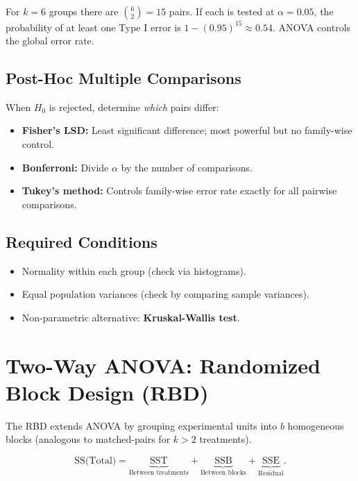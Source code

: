 \documentclass[12pt, a4paper]{article}
\begin{document}
For $k = 6$ groups there are $\binom{6}{2} = 15$ pairs. If each is tested at $\alpha = 0.05$, the probability of at least one Type I error is $1 - (0.95)^{15} \approx 0.54$. ANOVA controls the global error rate.

\subsection{Post-Hoc Multiple Comparisons}

When $H_0$ is rejected, determine \emph{which} pairs differ:
\begin{itemize}
  \item \textbf{Fisher's LSD:} Least significant difference; most powerful but no family-wise control.
  \item \textbf{Bonferroni:} Divide $\alpha$ by the number of comparisons.
  \item \textbf{Tukey's method:} Controls family-wise error rate exactly for all pairwise comparisons.
\end{itemize}

\subsection{Required Conditions}

\begin{itemize}
  \item Normality within each group (check via histograms).
  \item Equal population variances (check by comparing sample variances).
  \item Non-parametric alternative: \textbf{Kruskal-Wallis test}.
\end{itemize}

\section{Two-Way ANOVA: Randomized Block Design (RBD)}

The RBD extends ANOVA by grouping experimental units into $b$ homogeneous blocks (analogous to matched-pairs for $k > 2$ treatments).

\[
  \text{SS(Total)} = \underbrace{\text{SST}}_{\text{Between treatments}}
  + \underbrace{\text{SSB}}_{\text{Between blocks}}
  + \underbrace{\text{SSE}}_{\text{Residual}}.
\]
\end{document}

